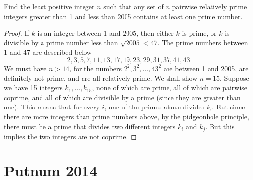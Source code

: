 \begin{exercise}
    Find the least positive integer $n$ such that any set of $n$ pairwise relatively prime integers greater than 1 and less than 2005 contains at least one prime number.
\end{exercise}
\begin{proof}
    If $k$ is an integer between 1 and $2005$, then either $k$ is prime, or $k$ is divisible by a prime number less than $\sqrt{2005} < 47$. The prime numbers between 1 and 47 are described below
    \[ 2,3,5,7,11,13,17,19,23,29,31,37,41,43 \]
    We must have $n > 14$, for the numbers $2^2, 3^2, \dots, 43^2$ are between 1 and 2005, are definitely not prime, and are all relatively prime. We shall show $n = 15$. Suppose we have 15 integers $k_1, \dots, k_{15}$, none of which are prime, all of which are pairwise coprime, and all of which are divisible by a prime (since they are greater than one). This means that for every $i$, one of the primes above divides $k_i$. But since there are more integers than prime numbers above, by the pidgeonhole principle, there must be a prime that divides two different integers $k_i$ and $k_j$. But this implies the two integers are not coprime.
\end{proof}

\section{Putnum 2014}

